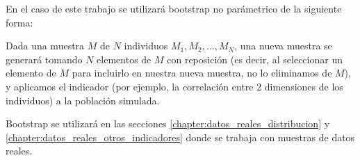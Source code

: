 En el caso de este trabajo se utilizará bootstrap no parámetrico de la siguiente forma:

Dada una muestra $M$ de $N$ individuos $M_1, M_2, \dots, M_N$, una nueva muestra se generará tomando $N$ elementos de $M$ con reposición (es decir, al seleccionar un elemento de $M$ para incluirlo en nuestra nueva muestra, no lo eliminamos de $M$), y aplicamos el indicador (por ejemplo, la correlación entre 2 dimensiones de los individuos) a la población simulada. 

Bootstrap se utilizará en las secciones \ref{chapter:datos_reales_distribucion} y \ref{chapter:datos_reales_otros_indicadores} donde se trabaja con muestras de datos reales.